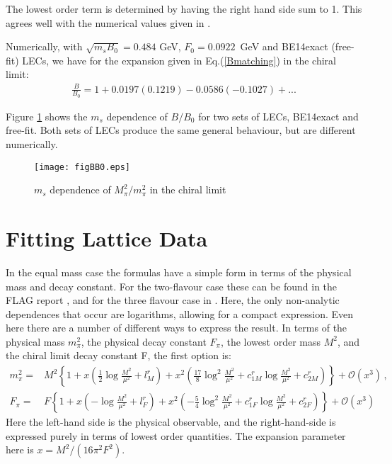 \documentclass[12pt,a4paper]{article}
\begin{document}
The lowest order term is determined by having the right hand side sum to 1.
This agrees well with the numerical values given in \cite{Bijnens:2014lea}.

Numerically, with $\sqrt{m_s B_0} = 0.484$ GeV, $F_0=0.0922$~GeV and BE14exact (free-fit) LECs, we have for the expansion given in Eq.(\ref{Bmatching}) in the chiral limit:
\begin{align}
	\frac{B}{B_0} = 1 + 0.0197 (0.1219) - 0.0586 (-0.1027) + ...
\end{align}

Figure \ref{MsvsMpi} shows the $m_{s}$ dependence of $B/B_0$ for two sets of LECs, BE14exact and free-fit. Both sets of LECs produce the same general behaviour, but are different numerically. 
\begin{figure}
\centering
\texttt{[image: figBB0.eps]}
\caption{$m_s$ dependence of $ M^2_{\pi}/m^2_{\pi}$ in the chiral limit} \label{MsvsMpi}
\end{figure}



\section{Fitting Lattice Data \label{SecLatticeFit} }

In the equal mass case the formulas have a simple form in terms of the physical mass and decay constant. For the two-flavour case these can be found in the FLAG report \cite{Aoki:2016frl}, and for the three flavour case in \cite{Bijnens:2009qm}. Here, the only non-analytic dependences that occur are logarithms, allowing for a compact expression. Even here there are a number of different ways to express the result. In terms of the physical mass $m_\pi^2$, the physical decay constant $F_\pi$, the lowest order mass $M^2$, and the chiral limit decay constant F, the first option is:
\begin{align}
\label{eq:2flavx}
m_\pi^2 =& M^2\left\{ 1 + x \left(\frac{1}{2}\log\frac{M^2}{\mu^2}+l_M^r\right)
+ x^2 \left(\frac{17}{8}\log^2\frac{M^2}{\mu^2}+c^r_{1M}\log\frac{M^2}{\mu^2}
+c^r_{2M}\right) \right\} + \mathcal{O}\left(x^3\right)
\,,\nonumber\\
F_\pi =& F \left\{ 1 + x \left(-\log\frac{M^2}{\mu^2}+l_F^r\right)
+ x^2 \left(-\frac{5}{4}\log^2\frac{M^2}{\mu^2}+c^r_{1F}\log\frac{M^2}{\mu^2}
+c^r_{2F}\right) \right\} + \mathcal{O} \left(x^3\right)
\end{align}
Here the left-hand side is the physical observable, and the right-hand-side is expressed purely in terms of lowest order quantities. The expansion parameter here is $x=M^2/(16\pi^2 F^2)$.
\end{document}
